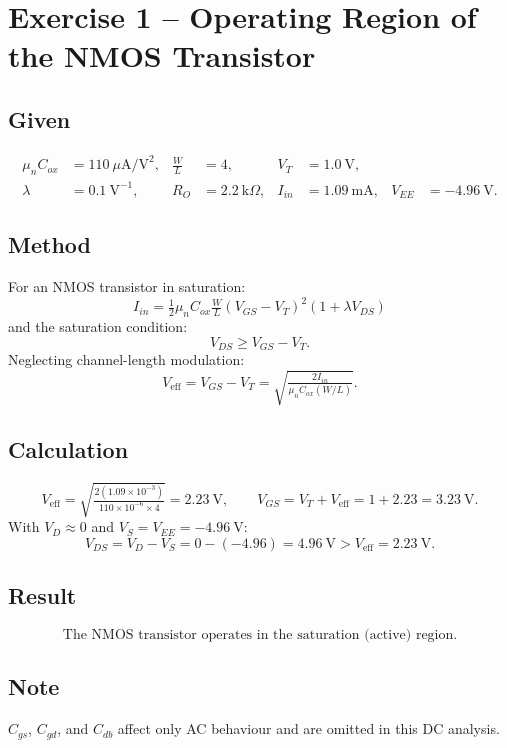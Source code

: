 \documentclass[main.tex]{subfiles}
\begin{document}
\section{Exercise 1 – Operating Region of the NMOS Transistor}

\subsection*{Given}
\[
\begin{aligned}
\mu_n C_{ox} &= 110~\mu\text{A/V}^2, &
\frac{W}{L} &= 4, &
V_T &= 1.0~\text{V},\\
\lambda &= 0.1~\text{V}^{-1}, &
R_O &= 2.2~\text{k}\Omega, &
I_{in} &= 1.09~\text{mA}, &
V_{EE} &= -4.96~\text{V}.
\end{aligned}
\]

\subsection*{Method}
For an NMOS transistor in saturation:
\begin{equation}
I_{in} = \tfrac{1}{2}\mu_n C_{ox}\tfrac{W}{L}(V_{GS}-V_T)^2(1+\lambda V_{DS})
\label{eq:1.1}
\end{equation}
and the saturation condition:
\begin{equation}
V_{DS} \ge V_{GS}-V_T.
\label{eq:1.2}
\end{equation}
Neglecting channel-length modulation:
\begin{equation}
V_{\text{eff}} = V_{GS}-V_T = \sqrt{\tfrac{2I_{in}}{\mu_n C_{ox}(W/L)}}.
\label{eq:1.3}
\end{equation}

\subsection*{Calculation}
\[
V_{\text{eff}} = \sqrt{\tfrac{2(1.09\times10^{-3})}{110\times10^{-6}\times4}}
=2.23~\text{V},\qquad
V_{GS}=V_T+V_{\text{eff}}=1+2.23=3.23~\text{V}.
\]
With \(V_D\approx0\) and \(V_S=V_{EE}=-4.96~\text{V}\):
\[
V_{DS}=V_D-V_S=0-(-4.96)=4.96~\text{V}>V_{\text{eff}}=2.23~\text{V}.
\]

\subsection*{Result}
\[
\boxed{\text{The NMOS transistor operates in the saturation (active) region.}}
\]

\subsection*{Note}
\(C_{gs}\), \(C_{gd}\), and \(C_{db}\) affect only AC behaviour
and are omitted in this DC analysis.
\end{document}
